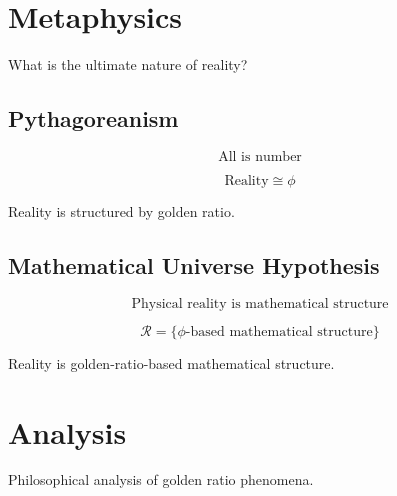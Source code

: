 \section{Metaphysics}

What is the ultimate nature of reality?

\subsection{Pythagoreanism}

\begin{definition}
\label{fa_31:def:pythagorean}
\begin{equation}
\text{All is number}
\end{equation}
\end{definition}

\begin{theorem}
\label{fa_31:thm:pythagorean-golden}
\begin{equation}
\text{Reality} \cong \phi
\end{equation}

Reality is structured by golden ratio.
\end{theorem}

\subsection{Mathematical Universe Hypothesis}

\begin{definition}[MUH]
\label{fa_31:def:muh}
\begin{equation}
\text{Physical reality is mathematical structure}
\end{equation}
\end{definition}

\begin{proposition}
\label{fa_31:prop:golden-muh}
\begin{equation}
\mathcal{R} = \{\phi\text{-based mathematical structure}\}
\end{equation}

Reality is golden-ratio-based mathematical structure.
\end{proposition}

\section{Analysis}

Philosophical analysis of golden ratio phenomena.

